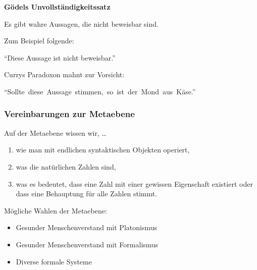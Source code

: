 \documentclass[12pt,compress,ngerman,utf8,t]{beamer}
\renewcommand{\_}{\mathpunct{.}\,}
\newcommand{\hil}[1]{{\usebeamercolor[fg]{item}{\textbf{#1}}}}
\begin{document}
\begin{frame}
  \centering
  \bigskip

  \Huge \hil{Abschnitt I}

  \bigskip
  \Large\textbf{Gödels Unvollständigkeitssatz}
  \par
  \bigskip

  \large

  Es gibt wahre Aussagen, die nicht beweisbar sind.

  \pause
  \bigskip
  \bigskip

  Zum Beispiel folgende:

  "`Diese Aussage ist nicht beweisbar."'
  \bigskip
  \bigskip
  \pause

  Currys Paradoxon mahnt zur Vorsicht:

  \mbox{\!\!\!\!\!\!"`Sollte diese Aussage stimmen, so ist der Mond aus Käse."'}
  \par
\end{frame}

\begin{frame}\frametitle{Vereinbarungen zur Metaebene}
  Auf der Metaebene wissen wir, \ldots
  \begin{enumerate}
    \item wie man mit endlichen syntaktischen Objekten operiert,

    \item was die natürlichen Zahlen sind,

    \begin{center}\end{center}

    \item was es bedeutet, dass eine Zahl mit einer gewissen Eigenschaft
    existiert oder dass eine Behauptung für alle Zahlen stimmt.
  \end{enumerate}

  \pause

  Mögliche Wahlen der Metaebene:
  \begin{itemize}
    \item Gesunder Menschenverstand mit Platonismus
    \item Gesunder Menschenverstand mit Formalismus
    \item Diverse formale Systeme
  \end{itemize}
\end{frame}
\end{document}
